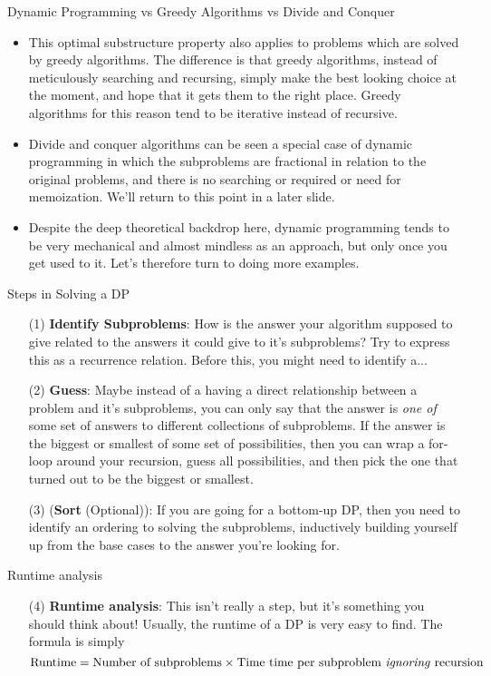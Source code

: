 \documentclass{beamer}
\begin{document}
\begin{frame}{Dynamic Programming vs Greedy Algorithms vs Divide and Conquer}
    \begin{itemize}
        \item This optimal substructure property also applies to problems which are solved by greedy algorithms. The difference is that greedy algorithms, instead of meticulously searching and recursing, simply make the best looking choice at the moment, and hope that it gets them to the right place. Greedy algorithms for this reason tend to be iterative instead of recursive. 
        \item Divide and conquer algorithms can be seen a special case of dynamic programming in which the subproblems are fractional in relation to the original problems, and there is no searching or required or need for memoization. We'll return to this point in a later slide.
        \item Despite the deep theoretical backdrop here, dynamic programming tends to be very mechanical and almost mindless as an approach, but only once you get used to it. Let's therefore turn to doing more examples. 
    \end{itemize}
\end{frame}

\begin{frame}{Steps in Solving a DP}
    \begin{itemize}
        \item[(1)] \textbf{Identify Subproblems}: How is the answer your algorithm supposed to give related to the answers it could give to it's subproblems? Try to express this as a recurrence relation. Before this, you might need to identify a... \pause 
        \item[(2)] \textbf{Guess}: Maybe instead of a having a direct relationship between a problem and it's subproblems, you can only say that the answer is \emph{one of} some set of answers to different collections of subproblems. If the answer is the biggest or smallest of some set of possibilities, then you can wrap a for-loop around your recursion, guess all possibilities, and then pick the one that turned out to be the biggest or smallest.
        \item[(3)] (\textbf{Sort} (Optional)): If you are going for a bottom-up DP, then you need to identify an ordering to solving the subproblems, inductively building yourself up from the base cases to the answer you're looking for. 
    \end{itemize}
\end{frame}

\begin{frame}{Runtime analysis}
    \begin{itemize}
        \item[(4)] \textbf{Runtime analysis}: This isn't really a step, but it's something you should think about! Usually, the runtime of a DP is very easy to find. The formula is simply
        \[ \textrm{Runtime} = \textrm{Number of subproblems}\times \textrm{Time time per subproblem \emph{ignoring} recursion} \] 
    \end{itemize}
    
\end{frame}
\end{document}
